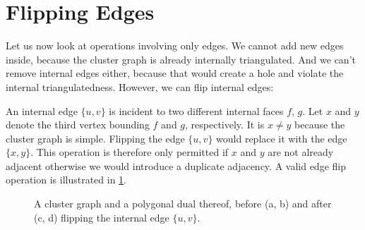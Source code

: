 \section{Flipping Edges}
\label{sect:fliping-edges}

Let us now look at operations involving only edges. We cannot add new edges inside, because the cluster graph is already internally triangulated. And we can't remove internal edges either, because that would create a hole and violate the internal triangulatedness. However, we can flip internal edges:

An internal edge $\{u,v\}$ is incident to two different internal faces $f$, $g$. Let $x$ and $y$ denote the third vertex bounding $f$ and $g$, respectively. It is $x \neq y$ because the cluster graph is simple. Flipping the edge $\{u,v\}$ would replace it with the edge $\{x,y\}$. This operation is therefore only permitted if $x$ and $y$ are not already adjacent \emdash{} otherwise we would introduce a duplicate adjacency. A valid edge flip operation is illustrated in \cref{fig:flip-internal-edge-example}.

\begin{figure}[H]
	\centering
	\quad
	\quad
	\quad
	\caption{A cluster graph and a polygonal dual thereof, before (a, b) and after (c, d) flipping the internal edge $\{u,v\}$.}
	\label{fig:flip-internal-edge-example}
\end{figure}

